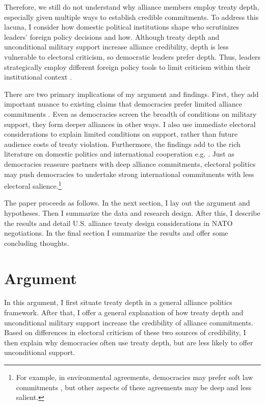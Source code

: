 \documentclass[12pt]{article}
\begin{document}
Therefore, we still do not understand why alliance members employ treaty depth, especially given multiple ways to establish credible commitments. 
To address this lacuna, I consider how domestic political institutions shape who scrutinizes leaders' foreign policy decisions and how.
Although treaty depth and unconditional military support increase alliance credibility, depth is less vulnerable to electoral criticism, so democratic leaders prefer depth. 
Thus, leaders strategically employ different foreign policy tools to limit criticism within their institutional context \citep{HydeSaunders2020}. 


There are two primary implications of my argument and findings. 
First, they add important nuance to existing claims that democracies prefer limited alliance commitments \citep{Mattes2012, Chibaetal2015, FjelstulReiter2019}. 
Even as democracies screen the breadth of conditions on military support, they form deeper alliances in other ways.
I also use immediate electoral considerations to explain limited conditions on support, rather than future audience costs of treaty violation.
Furthermore, the findings add to the rich literature on domestic politics and international cooperation e.g. \citep{DownesRocke1995, Fearon1998, Leeds1999, MattesRodriguez2014}. 
Just as democracies reassure partners with deep alliance commitments, electoral politics may push democracies to undertake strong international commitments with less electoral salience.\footnote{For example, in environmental agreements, democracies may prefer soft law commitments \citep{BoehmeltButkute2018}, but other aspects of these agreements may be deep and less salient.} 


The paper proceeds as follows. 
In the next section, I lay out the argument and hypotheses. 
Then I summarize the data and research design. 
After this, I describe the results and detail U.S. alliance treaty design considerations in NATO negotiations.
In the final section I summarize the results and offer some concluding thoughts. 


\section{Argument}


In this argument, I first situate treaty depth in a general alliance politics framework.  
After that, I offer a general explanation of how treaty depth and unconditional military support increase the credibility of alliance commitments. 
Based on differences in electoral criticism of these two sources of credibility, I then explain why democracies often use treaty depth, but are less likely to offer unconditional support. 
\end{document}
